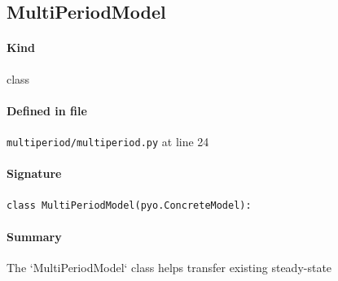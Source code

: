 \documentclass[11pt]{report}
\begin{document}
\subsection{MultiPeriodModel}
\label{def:multiperiod-multiperiod.py:MultiPeriodModel:L24}
\paragraph{Kind} class
\paragraph{Defined in file} \texttt{multiperiod/multiperiod.py} at line 24
\paragraph{Signature} \texttt{class MultiPeriodModel(pyo.ConcreteModel):}
\paragraph{Summary} The `MultiPeriodModel` class helps transfer existing steady-state
\end{document}
